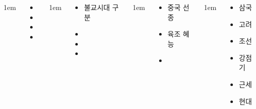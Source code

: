 \documentclass[	20pt, 
							a0paper, 
							landscape,
							margin=0mm, %
							innermargin=10mm,  		%
							blockverticalspace=4mm, %
							colspace=5mm, 
							subcolspace=0mm
							]{tikzposter}
\begin{document}
\begin{columns}
			{
					\setlength{\leftmargini}{4em}
					\setlength{\labelsep} {1em}
				\begin{LARGE}
					\begin{itemize}
					\item 
					\item 
					\item 
					\item 
					\end{itemize}
				\end{LARGE}
			}




			{
					\setlength{\leftmargini}{3em}
					\setlength{\labelsep} {1em}
				\begin{LARGE}
					\begin{itemize}
					\item 불교시대 구분
					\item 
					\item 
					\item 
					\end{itemize}
				\end{LARGE}
			} %


			{
					\setlength{\leftmargini}{3em}
					\setlength{\labelsep} {1em}
				\begin{LARGE}
					\begin{itemize}
					\item 중국 선종
					\item 육조 혜능 
					\item 
					\end{itemize}
				\end{LARGE}
			} %


			{
					\setlength{\leftmargini}{3em}
					\setlength{\labelsep} {1em}
				\begin{LARGE}
					\begin{itemize}
					\item 삼국
					\item 고려
					\item 조선
					\item 강점기
					\item 근세
					\item 현대


\end{itemize}
\end{LARGE}}
\end{columns}
\end{document}
